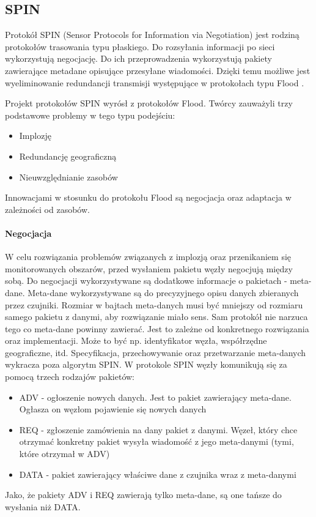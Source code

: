 \subsection{SPIN}
Protokół SPIN (Sensor Protocols for Information via Negotiation) jest rodziną protokołów trasowania typu płaskiego. Do rozsyłania informacji po sieci wykorzystują negocjację. Do ich przeprowadzenia wykorzystują pakiety zawierające metadane opisujące przesyłane wiadomości. Dzięki temu możliwe jest wyeliminowanie redundancji transmisji występujące w protokołach typu Flood \cite{Chaudhary2015}.

Projekt protokołów SPIN wyrósł z protokołów Flood. Twórcy zauważyli trzy podstawowe problemy w tego typu podejściu:
\begin{itemize}
	\item Implozję
	\item Redundancję geograficzną
	\item Nieuwzględnianie zasobów
\end{itemize}

Innowacjami w stosunku do protokołu Flood są negocjacja oraz adaptacja w zależności od zasobów.

\paragraph{Negocjacja} W celu rozwiązania problemów związanych z implozją oraz przenikaniem się monitorowanych obszarów, przed wysłaniem pakietu węzły negocjują między sobą. Do negocjacji wykorzystywane są dodatkowe informacje o pakietach - meta-dane. 
Meta-dane wykorzystywane są do precyzyjnego opisu danych zbieranych przez czujniki. Rozmiar w bajtach meta-danych musi być mniejszy od rozmiaru samego pakietu z danymi, aby rozwiązanie miało sens.
Sam protokół nie narzuca tego co meta-dane powinny zawierać. Jest to zależne od konkretnego rozwiązania oraz implementacji. Może to być np. identyfikator węzła, współrzędne geograficzne, itd. Specyfikacja, przechowywanie oraz przetwarzanie meta-danych wykracza poza algorytm SPIN.
W protokole SPIN węzły komunikują się za pomocą trzech rodzajów pakietów:
\begin{itemize}
	\item ADV - ogłoszenie nowych danych. Jest to pakiet zawierający meta-dane. Ogłasza on węzłom pojawienie się nowych danych
	\item REQ - zgłoszenie zamówienia na dany pakiet z danymi. Węzeł, który chce otrzymać konkretny pakiet wysyła wiadomość z jego meta-danymi (tymi, które otrzymał w ADV)
	\item DATA - pakiet zawierający właściwe dane z czujnika wraz z meta-danymi
\end{itemize}
Jako, że pakiety ADV i REQ zawierają tylko meta-dane, są one tańsze do wysłania niż DATA.

